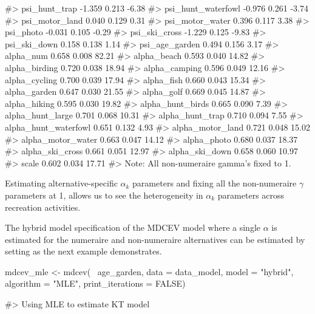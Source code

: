 \begin{Schunk}
\begin{Soutput}
#> psi_hunt_trap          -1.359   0.213  -6.38
#> psi_hunt_waterfowl     -0.976   0.261  -3.74
#> psi_motor_land          0.040   0.129   0.31
#> psi_motor_water         0.396   0.117   3.38
#> psi_photo              -0.031   0.105  -0.29
#> psi_ski_cross          -1.229   0.125  -9.83
#> psi_ski_down            0.158   0.138   1.14
#> psi_age_garden          0.494   0.156   3.17
#> alpha_num               0.658   0.008  82.21
#> alpha_beach             0.593   0.040  14.82
#> alpha_birding           0.720   0.038  18.94
#> alpha_camping           0.596   0.049  12.16
#> alpha_cycling           0.700   0.039  17.94
#> alpha_fish              0.660   0.043  15.34
#> alpha_garden            0.647   0.030  21.55
#> alpha_golf              0.669   0.045  14.87
#> alpha_hiking            0.595   0.030  19.82
#> alpha_hunt_birds        0.665   0.090   7.39
#> alpha_hunt_large        0.701   0.068  10.31
#> alpha_hunt_trap         0.710   0.094   7.55
#> alpha_hunt_waterfowl    0.651   0.132   4.93
#> alpha_motor_land        0.721   0.048  15.02
#> alpha_motor_water       0.663   0.047  14.12
#> alpha_photo             0.680   0.037  18.37
#> alpha_ski_cross         0.661   0.051  12.97
#> alpha_ski_down          0.658   0.060  10.97
#> scale                   0.602   0.034  17.71
#> Note: All non-numeraire gamma's fixed to 1.
\end{Soutput}
\end{Schunk}

Estimating alternative-specific \(\alpha_k\) parameters and fixing all
the non-numeraire \(\gamma\) parameters at 1, allows us to see the
heterogeneity in \(\alpha_k\) parameters across recreation activities.

The hybrid model specification of the MDCEV model where a single
\(\alpha\) is estimated for the numeraire and non-numeraire alternatives
can be estimated by setting  as the next example
demonstrates.

\begin{Schunk}
\begin{Sinput}
mdcev_mle <- mdcev(~ age_garden,
                  data = data_model,
                  model = "hybrid",
                  algorithm = "MLE",
                  print_iterations = FALSE)
\end{Sinput}
\begin{Soutput}
#> Using MLE to estimate KT model
\end{Soutput}
\end{Schunk}

